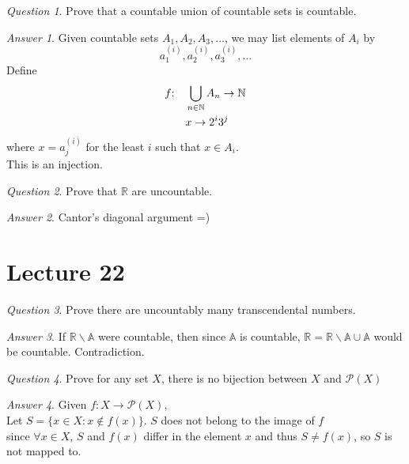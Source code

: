 \documentclass[]{article}
\def\naturals{\mathbb{N}}
\def\algebraics{\mathbb{A}}
\def\reals{\mathbb{R}}
\def\powerset{\mathcal{P}}
\theoremstyle{remark}
\theoremstyle{qnstyle}
\newtheorem{question}{Question}
\theoremstyle{answerstyle}
\newtheorem*{answer}{Answer}
\begin{document}
\begin{question}
    Prove that a countable union of countable sets is countable.
\end{question}
\begin{answer}
    Given countable sets $A_1, A_2, A_3, \ldots$, we may list elements of $A_i$ by 
        $$a_1^{(i)}, a_2^{(i)}, a_3^{(i)}, \ldots$$ 
    Define 
    \begin{align*}
        f \mkern-5mu: \quad &\bigcup_{n \in \naturals} A_n \to \naturals \\
                 &x \to 2^i 3^j
    \end{align*}
    where $x = a_j^{(i)}$ for the least $i$ such that $x \in A_i$. \\
    This is an injection.
\end{answer}

\begin{question}
    Prove that $\reals$ are uncountable.
\end{question}
\begin{answer}
    Cantor's diagonal argument =)
\end{answer}






\section* {Lecture 22}

\begin{question}
    Prove there are uncountably many transcendental numbers.
\end{question}
\begin{answer}
    If $\reals \backslash \algebraics$ were countable, then since $\algebraics$ is countable,
    $\reals = \reals \backslash \algebraics \cup \algebraics$ would be countable. Contradiction.
\end{answer}

\begin{question}
    Prove for any set $X$, there is no bijection between $X$ and $\powerset(X)$
\end{question}
\begin{answer}
    Given $f: X \to \powerset(X)$,\\
    Let $S = \{x \in X: x \not \in f(x) \}$. $S$ does not belong to the image of $f$\\
    since $\forall x \in X$, $S$ and $f(x)$ differ in the element $x$ and thus $S \not = f(x)$,
    so $S$ is not mapped to.
\end{answer}
\end{document}
